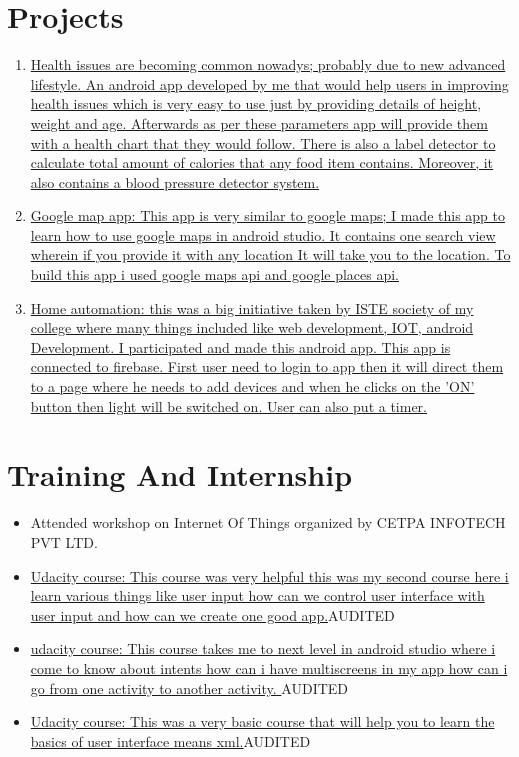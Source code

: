 \documentclass{article}
\begin{document}
	\section{Projects}
		\begin{enumerate}
			\item \href{https://github.com/jindalshiva/heart}{ Health issues are becoming common nowadys; probably due to new advanced lifestyle. An android app developed by me that would help users in improving health issues which is very easy to use just by providing details of height, weight and age. Afterwards as per these parameters app will provide them with a health chart that they would follow. There is also a label detector to calculate total amount of calories that any food item contains. Moreover, it also contains a blood pressure detector system.}
			\item \href{https://github.com/jindalshiva/GooglePlacesGoogleMaps} { Google map app: This app is very similar to google maps; I made this app to learn how to use google maps in android studio. It contains one search view wherein if you provide it with any location It will take you to the location. To build this app i used google maps api and google places api.}
			\item \href{https://github.com/jindalshiva/ISTY_1.2.3-master-master} { Home automation: this was a big initiative taken by ISTE society of my college where many things included like web development, IOT, android Development. I participated and made this android app. This app is connected to firebase. First user need to login to app then it will direct them to a page where he needs to add devices and when he clicks on the 'ON' button then light will be switched on. User can also put a timer.}

		\end{enumerate}
	\section{Training And Internship}
		\begin{itemize}
			\item {Attended workshop on Internet Of Things organized by CETPA INFOTECH PVT LTD.}
			\item \href{https://classroom.udacity.com/courses/ud836}{Udacity course: This course was very helpful this was my second course here i learn various things like user input how can we control user interface with user input and how can we create one good app.}{AUDITED}
			\item \href{https://classroom.udacity.com/courses/ud839}{udacity course: This course takes me to next level in android studio where i come to know about intents how can i have multiscreens in my app how can i go from one activity to another activity. }{AUDITED}
			\item \href{https://classroom.udacity.com/courses/ud834}{Udacity course: This was a very basic course that will help you to learn the basics of user interface means xml.}{AUDITED}
		\end{itemize}
\end{document}
